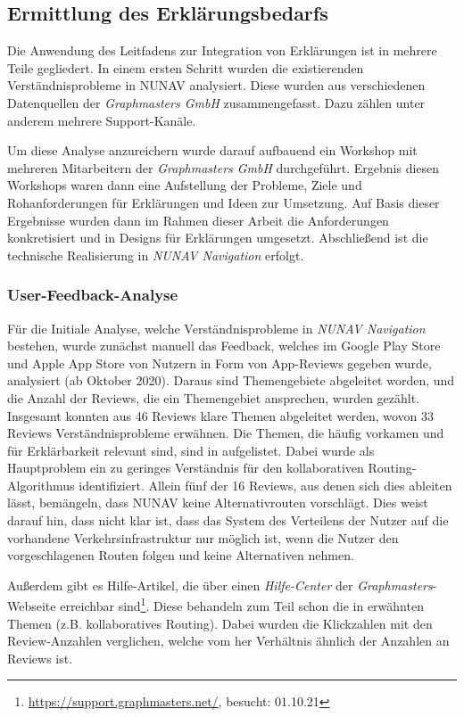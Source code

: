\subsection{Ermittlung des Erklärungsbedarfs}
\label{sec:explanation_demand_generation}

Die Anwendung des Leitfadens zur Integration von Erklärungen ist in mehrere Teile gegliedert. In einem ersten Schritt wurden die existierenden Verständnisprobleme in NUNAV analysiert. Diese wurden aus verschiedenen Datenquellen der \textit{Graphmasters GmbH} zusammengefasst. Dazu zählen unter anderem mehrere Support-Kanäle.

Um diese Analyse anzureichern wurde darauf aufbauend ein Workshop mit mehreren Mitarbeitern der \textit{Graphmasters GmbH} durchgeführt. Ergebnis diesen Workshops waren dann eine Aufstellung der Probleme, Ziele und Rohanforderungen für Erklärungen und Ideen zur Umsetzung. Auf Basis dieser Ergebnisse wurden dann im Rahmen dieser Arbeit die Anforderungen konkretisiert und in Designs für Erklärungen umgesetzt. Abschließend ist die technische Realisierung in \textit{NUNAV Navigation} erfolgt.

\subsubsection{User-Feedback-Analyse}

Für die Initiale Analyse, welche Verständnisprobleme in \textit{NUNAV Navigation} bestehen, wurde zunächst manuell das Feedback, welches im Google Play Store und Apple App Store von Nutzern in Form von App-Reviews gegeben wurde, analysiert (ab Oktober 2020). Daraus sind Themengebiete abgeleitet worden, und die Anzahl der Reviews, die ein Themengebiet ansprechen, wurden gezählt. Insgesamt konnten aus 46 Reviews klare Themen abgeleitet werden, wovon 33 Reviews Verständnisprobleme erwähnen. Die Themen, die häufig vorkamen und für Erklärbarkeit relevant sind, sind in  aufgelistet. Dabei wurde als Hauptproblem ein zu geringes Verständnis für den kollaborativen Routing-Algorithmus identifiziert. Allein fünf der 16 Reviews, aus denen sich dies ableiten lässt, bemängeln, dass NUNAV keine Alternativrouten vorschlägt. Dies weist darauf hin, dass nicht klar ist, dass das System des Verteilens der Nutzer auf die vorhandene Verkehrsinfrastruktur nur möglich ist, wenn die Nutzer den vorgeschlagenen Routen folgen und keine Alternativen nehmen.

Außerdem gibt es Hilfe-Artikel, die über einen \textit{Hilfe-Center} der \textit{Graphmasters}-Webseite erreichbar sind\footnote{\url{https://support.graphmasters.net/}, besucht: 01.10.21}. Diese behandeln zum Teil schon die in  erwähnten Themen (z.B. kollaboratives Routing). Dabei wurden die Klickzahlen mit den Review-Anzahlen verglichen, welche vom her Verhältnis ähnlich der Anzahlen an Reviews ist.

